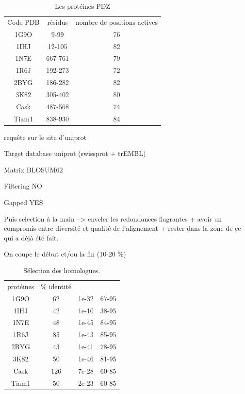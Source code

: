     \clearpage


    \begin{table}[!htbp]
      \centering

      \begin{tabular}{ccc}

        \toprule
        Code PDB & résidus & nombre de positions actives\\
        \cmidrule{1-3}
        1G9O  & 	9-99	 & 	76	 \\
        1IHJ  & 	12-105	 & 	82	 \\
        1N7E  & 	667-761	 & 	79	 \\
        1R6J  & 	192-273	 & 	72	 \\
        2BYG  & 	186-282	 & 	82	 \\
        3K82  & 	305-402	 & 	80	 \\
        Cask  & 	487-568	 & 	74	 \\
        Tiam1 & 	838-930	 & 	84	 \\
        \bottomrule

      \end{tabular}      
      \caption{Les protéines PDZ}
\label{tab:protéines_PDZ}      
    \end{table}



requête sur le site d'uniprot

Target database uniprot (swissprot + trEMBL)

Matrix BLOSUM62

Filtering NO

Gapped YES


Puis selection à la main -->
enveler les redondances flagrantes
 + avoir un compromis entre diversité et qualité de l'alignement
 + rester dans la zone de ce qui a déjà été fait.

On coupe le début et/ou la fin (10-20 \%)



    \begin{table}[!htbp]
      \centering

      \begin{tabular}{cccc}

        \toprule
        protéines & \% identité \\
        \cmidrule{1-4}
     1G9O  & 62  &    1e-32  &  67-95 \\
     1IHJ  & 42  &    1e-10  &  38-95 \\
     1N7E  & 48  &    1e-45  &  84-95 \\
     1R6J  & 85  &    1e-43  &  85-95 \\
     2BYG  & 43  &    1e-41  &  78-95 \\
     3K82  & 50  &    1e-46  &  81-95 \\
     Cask  & 126 &    7e-28  &  60-85 \\
     Tiam1 & 50  &    2e-23  &  60-85 \\

        \bottomrule

      \end{tabular}      
      \caption{Sélection des homologues.}
\label{tab:select_homo}      
    \end{table}

